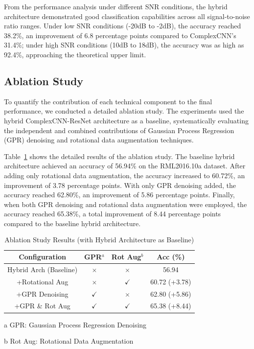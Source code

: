 \documentclass[conference]{IEEEtran}
\begin{document}
From the performance analysis under different SNR conditions, the hybrid architecture demonstrated good classification capabilities across all signal-to-noise ratio ranges. Under low SNR conditions (-20dB to -2dB), the accuracy reached 38.2\%, an improvement of 6.8 percentage points compared to ComplexCNN's 31.4\%; under high SNR conditions (10dB to 18dB), the accuracy was as high as 92.4\%, approaching the theoretical upper limit.

\subsection{Ablation Study}

To quantify the contribution of each technical component to the final performance, we conducted a detailed ablation study. The experiments used the hybrid ComplexCNN-ResNet architecture as a baseline, systematically evaluating the independent and combined contributions of Gaussian Process Regression (GPR) denoising and rotational data augmentation techniques.

Table~\ref{tab:ablation_study} shows the detailed results of the ablation study. The baseline hybrid architecture achieved an accuracy of 56.94\% on the RML2016.10a dataset. After adding only rotational data augmentation, the accuracy increased to 60.72\%, an improvement of 3.78 percentage points. With only GPR denoising added, the accuracy reached 62.80\%, an improvement of 5.86 percentage points. Finally, when both GPR denoising and rotational data augmentation were employed, the accuracy reached 65.38\%, a total improvement of 8.44 percentage points compared to the baseline hybrid architecture.

\begin{table}[!htbp]
\centering
\caption{Ablation Study Results (with Hybrid Architecture as Baseline)}
\label{tab:ablation_study}
\begin{threeparttable}
\begin{tabular}{@{}cccc@{}}
\toprule
Configuration & GPR$^{a}$ & Rot Aug$^{b}$ & Acc (\%) \\
\midrule
Hybrid Arch (Baseline) & $\times$ & $\times$ & 56.94 \\
+Rotational Aug & $\times$ & $\checkmark$ & 60.72 (+3.78) \\
+GPR Denoising & $\checkmark$ & $\times$ & 62.80 (+5.86) \\
+GPR \& Rot Aug & $\checkmark$ & $\checkmark$ & 65.38 (+8.44) \\
\bottomrule
\end{tabular}
\begin{tablenotes}
\footnotesize
\item[a] GPR: Gaussian Process Regression Denoising
\item[b] Rot Aug: Rotational Data Augmentation
\end{tablenotes}
\end{threeparttable}
\end{table}
\end{document}
